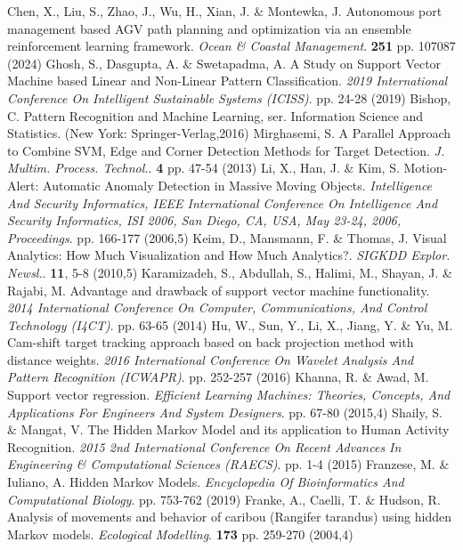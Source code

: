 Chen, X., Liu, S., Zhao, J., Wu, H., Xian, J. \& Montewka, J. Autonomous port management based AGV path planning and optimization via an ensemble reinforcement learning framework. {\em Ocean \& Coastal Management}. \textbf{251} pp. 107087 (2024)
Ghosh, S., Dasgupta, A. \& Swetapadma, A. A Study on Support Vector Machine based Linear and Non-Linear Pattern Classification. {\em 2019 International Conference On Intelligent Sustainable Systems (ICISS)}. pp. 24-28 (2019)
Bishop, C. Pattern Recognition and Machine Learning, ser. Information Science and Statistics. (New York: Springer-Verlag,2016)
Mirghasemi, S. A Parallel Approach to Combine SVM, Edge and Corner Detection Methods for Target Detection. {\em J. Multim. Process. Technol.}. \textbf{4} pp. 47-54 (2013)
Li, X., Han, J. \& Kim, S. Motion-Alert: Automatic Anomaly Detection in Massive Moving Objects. {\em Intelligence And Security Informatics, IEEE International Conference On Intelligence And Security Informatics, ISI 2006, San Diego, CA, USA, May 23-24, 2006, Proceedings}. pp. 166-177 (2006,5)
Keim, D., Mansmann, F. \& Thomas, J. Visual Analytics: How Much Visualization and How Much Analytics?. {\em SIGKDD Explor. Newsl.}. \textbf{11}, 5-8 (2010,5)
Karamizadeh, S., Abdullah, S., Halimi, M., Shayan, J. \& Rajabi, M. Advantage and drawback of support vector machine functionality. {\em 2014 International Conference On Computer, Communications, And Control Technology (I4CT)}. pp. 63-65 (2014)
Hu, W., Sun, Y., Li, X., Jiang, Y. \& Yu, M. Cam-shift target tracking approach based on back projection method with distance weights. {\em 2016 International Conference On Wavelet Analysis And Pattern Recognition (ICWAPR)}. pp. 252-257 (2016)
Khanna, R. \& Awad, M. Support vector regression. {\em Efficient Learning Machines: Theories, Concepts, And Applications For Engineers And System Designers}. pp. 67-80 (2015,4)
Shaily, S. \& Mangat, V. The Hidden Markov Model and its application to Human Activity Recognition. {\em 2015 2nd International Conference On Recent Advances In Engineering \& Computational Sciences (RAECS)}. pp. 1-4 (2015)
Franzese, M. \& Iuliano, A. Hidden Markov Models. {\em Encyclopedia Of Bioinformatics And Computational Biology}. pp. 753-762 (2019)
Franke, A., Caelli, T. \& Hudson, R. Analysis of movements and behavior of caribou (Rangifer tarandus) using hidden Markov models. {\em Ecological Modelling}. \textbf{173} pp. 259-270 (2004,4)
